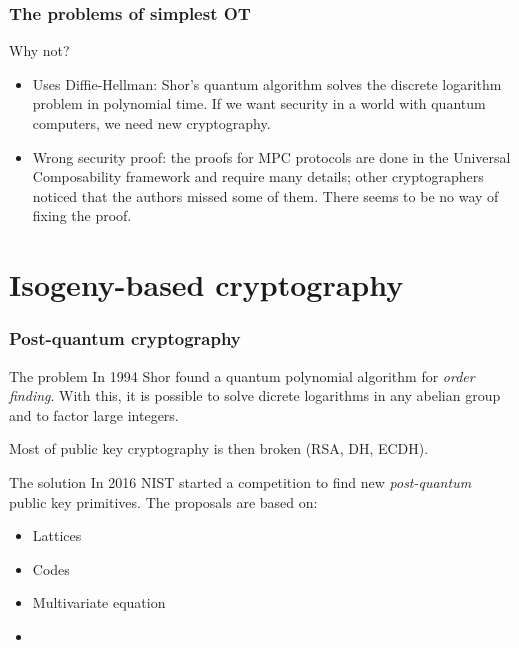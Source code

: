 \documentclass{beamer}
\begin{document}
    \begin{frame}
        \frametitle{The problems of simplest OT}
        
        \begin{block}{Why not?}
            \begin{itemize}[<+->]
                \item Uses Diffie-Hellman: Shor's quantum algorithm solves the discrete logarithm problem in polynomial time. If we want security in a world with quantum computers, we need new cryptography.
                \item Wrong security proof: the proofs for MPC protocols are done in the Universal Composability framework and require many details; other cryptographers noticed that the authors missed some of them. There seems to be no way of fixing the proof.
            \end{itemize}
        \end{block}
    \end{frame}


    \section{Isogeny-based cryptography}
    
    \begin{frame}
        \frametitle{Post-quantum cryptography}
        
        \begin{block}{The problem}
            In 1994 Shor found a quantum polynomial algorithm for \emph{order finding}. With this, it is possible to solve dicrete logarithms in any abelian group and to factor large integers.
            
            Most of public key cryptography is then broken (RSA, DH, ECDH).
        \end{block}
    
        \pause
        \begin{block}{The solution}
            In 2016 NIST started a competition to find new \emph{post-quantum} public key primitives. The proposals are based on:
            \begin{itemize}
                \item Lattices
                \item Codes
                \item Multivariate equation
                \item {}
            \end{itemize}
        \end{block}
    \end{frame}
\end{document}
